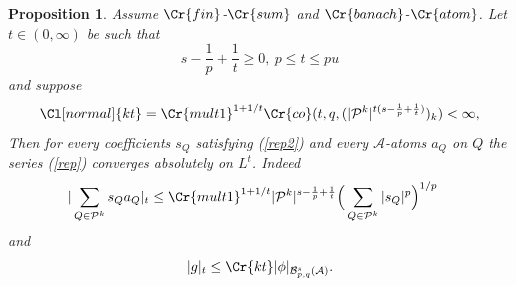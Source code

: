 \documentclass{amsart}
\newtheorem{proposition}[theorem]{Proposition}
\theoremstyle{definition}
\newcommand{\Cll}[2][normal]{\Cl[#1]{#2}}
\newcommand{\Crr}[1]{\Cr{#1}}
\begin{document}
\begin{proposition}\label{lp}   Assume ${\Crr{fin}}$-${\Crr{sum}}$ and ${\Crr{banach}}$-${\Crr{atom}}$. Let $t \in (0,\infty)$ be such that 
\begin{equation}\label{c11} s-\frac{1}{p}+\frac{1}{t} \geq 0, \ p \leq t \leq pu\end{equation} 
and suppose
\begin{equation}\label{decay}  \Cll{kt}=\Crr{mult1}^{1+1/t}  \Crr{co}(t,q, ( |\mathcal{P}^k|^{t(s-\frac{1}{p} +\frac{1}{t})} )_k ) < \infty,\end{equation} 
Then for every coefficients $s_Q$ satisfying (\ref{rep2}) and every $\mathcal{A}$-atoms $a_Q$  on $Q$ the series (\ref{rep}) converges absolutely on $L^t$. Indeed 
\begin{align}\label{flp}
|\sum_{Q \in \mathcal{P}^k}   s_Q a_Q|_t&\leq  \Crr{mult1}^{1+1/t}   |\mathcal{P}^k|^{s-\frac{1}{p} +\frac{1}{t}} \Big(  \sum_{Q \in \mathcal{P}^k} |s_Q|^p   \Big)^{1/p}
\end{align} 
and
\begin{equation}\label{inclulp}  |g|_{t} \leq  \Crr{kt} | \phi|_{\mathcal{B}^s_{p,q}(\mathcal{A})}.\end{equation}
\end{proposition}
\end{document}
